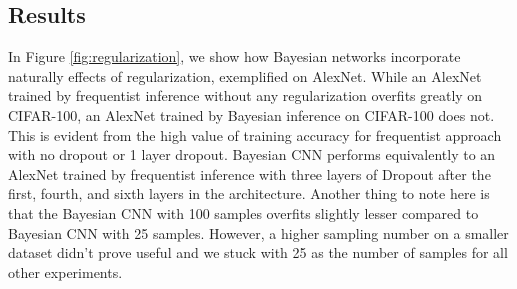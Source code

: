 \subsection{Results}

\begin{table}[H]
\tiny
    \centering
    \renewcommand{\arraystretch}{1.5}
    \renewcommand{\arraystretch}{1.5}
    \caption{Comparison of validation accuracies (in percentage) for different architectures with variational inference (VI), frequentist inference and Dropout as a Bayesian approximation as proposed by Gal and Ghahramani \cite{gal2015bayesian} for MNIST, CIFAR-10, and CIFAR-100.}
    \label{tab:resultsCIFAR-100}
\end{table}

In Figure \ref{fig:regularization}, we show how Bayesian networks incorporate naturally effects of regularization, exemplified on AlexNet. While an AlexNet trained by frequentist inference without any regularization overfits greatly on CIFAR-100, an AlexNet trained by Bayesian inference on CIFAR-100 does not. This is evident from the high value of training accuracy for frequentist approach with no dropout or 1 layer dropout. Bayesian CNN performs equivalently to an AlexNet trained by frequentist inference with three layers of Dropout after the first, fourth, and sixth layers in the architecture.
Another thing to note here is that the Bayesian CNN with 100 samples overfits slightly lesser compared to Bayesian CNN with 25 samples. However, a higher sampling number on a smaller dataset didn't prove useful and we stuck with 25 as the number of samples for all other experiments.


